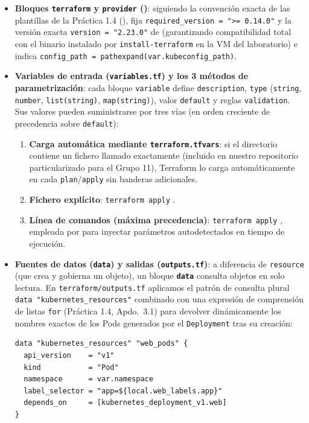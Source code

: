\begin{itemize}
  \item \textbf{Bloques \texttt{terraform} y \texttt{provider} ()}: siguiendo la convención exacta de las plantillas de la Práctica 1.4 (), fija \texttt{required\_version = ">= 0.14.0"} y la versión exacta \texttt{version = "2.23.0"} de  (garantizando compatibilidad total con el binario instalado por \texttt{install-terraform} en la VM del laboratorio) e indica \texttt{config\_path = pathexpand(var.kubeconfig\_path)}.
  \item \textbf{Variables de entrada (\texttt{variables.tf}) y los 3 métodos de parametrización}: cada bloque \texttt{variable} define \texttt{description}, \texttt{type} (\texttt{string}, \texttt{number}, \texttt{list(string)}, \texttt{map(string)}), valor \texttt{default} y reglas \texttt{validation}. Sus valores pueden suministrarse por tres vías (en orden creciente de precedencia sobre \texttt{default}):
    \begin{enumerate}
      \item \textbf{Carga automática mediante \texttt{terraform.tfvars}}: si el directorio contiene un fichero llamado exactamente  (incluido en nuestro repositorio particularizado para el Grupo 11), Terraform lo carga automáticamente en cada \texttt{plan}/\texttt{apply} sin banderas adicionales.
      \item \textbf{Fichero explícito}: \texttt{terraform apply} .
      \item \textbf{Línea de comandos (máxima precedencia)}: \texttt{terraform apply} , empleada por  para inyectar parámetros autodetectados en tiempo de ejecución.
    \end{enumerate}
  \item \textbf{Fuentes de datos (\texttt{data}) y salidas (\texttt{outputs.tf})}: a diferencia de \texttt{resource} (que crea y gobierna un objeto), un bloque \textbf{\texttt{data}} consulta objetos en solo lectura. En \texttt{terraform/outputs.tf} aplicamos el patrón de consulta plural \texttt{data "kubernetes\_resources"} combinado con una expresión de comprensión de listas \texttt{for} (Práctica 1.4, Apdo.~3.1) para devolver dinámicamente los nombres exactos de los Pods generados por el \texttt{Deployment} tras su creación:
\begin{lstlisting}[language=HCL,caption={Consulta dinámica de Pods con \texttt{data "kubernetes\_resources"} y bloque \texttt{output} en \texttt{outputs.tf}.}]
data "kubernetes_resources" "web_pods" {
  api_version    = "v1"
  kind           = "Pod"
  namespace      = var.namespace
  label_selector = "app=${local.web_labels.app}"
  depends_on     = [kubernetes_deployment_v1.web]
}


\end{lstlisting}
\end{itemize}

